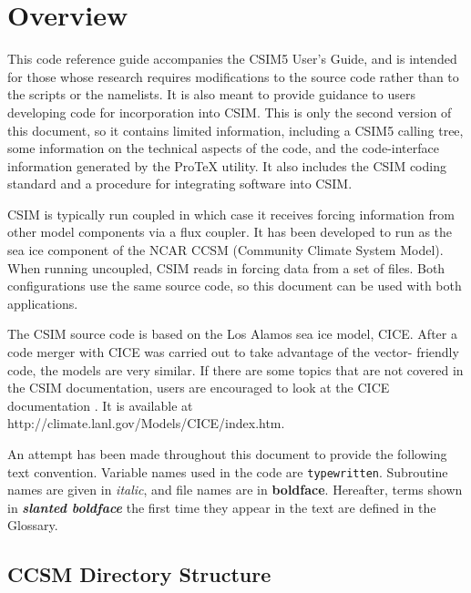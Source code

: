 \documentclass[]{article}
\begin{document}

\tableofcontents

\newpage


\section {Overview}

This code reference guide accompanies the CSIM5 User's Guide, and is intended
for those whose research requires modifications to the source code rather than 
to the scripts or the namelists.  It is also meant to provide guidance
to users developing code for incorporation into CSIM.  This is only the second
version of this document, so it contains limited information, including a CSIM5
calling tree, some information on the technical aspects of the code, and the
code-interface information generated by the ProTeX utility.  It also includes the
CSIM coding standard and a procedure for integrating software into CSIM.

CSIM is typically run coupled in which case it receives forcing information from
other model components via a flux coupler.  It has been developed to run as the
sea ice component of the NCAR CCSM (Community Climate System Model).  When running uncoupled,
CSIM reads in forcing data from a set of files. Both configurations use the
same source code, so this document can be used with both applications.

The CSIM source code is based on the Los Alamos sea ice model, CICE.
After a code merger with CICE was carried out to take advantage of the vector-
friendly code, the models are very similar.  If there are some topics that
are not covered in the CSIM documentation, users are encouraged to look
at the CICE documentation \cite[]{cice04}.  It is available at
http://climate.lanl.gov/Models/CICE/index.htm.

An attempt has been made throughout this document to provide the following
text convention.  Variable names used in the code are {\tt typewritten}.
Subroutine names are given in {\it italic}, and file names are in {\bf boldface}.
Hereafter, terms shown in {\bf \textsl{slanted boldface}} the first time they
appear in the text are defined in the Glossary. 


\subsection {CCSM Directory Structure}
\label{sec:ccsm_dir_structure}
\end{document}
